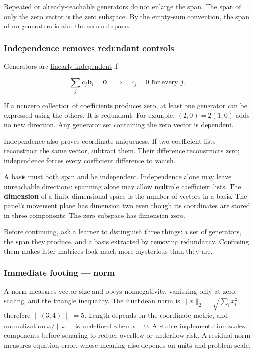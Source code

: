 Repeated or already-reachable generators do not enlarge the span. The span of only the zero vector is the zero subspace. By the empty-sum convention, the span of no generators is also the zero subspace.

\subsubsection{Independence removes redundant controls}\label{01-foundations-i-ch017-independence-removes-redundant-controls}

Generators are \hyperref[01-foundations-i-ch019-coordinates-can-change-while-the-geometric-object-stays-still]{linearly independent} if

\[
\sum_jc_j\mathbf b_j=\mathbf0
\quad\Longrightarrow\quad c_j=0\text{ for every }j.
\]

If a nonzero collection of coefficients produces zero, at least one generator can be expressed using the others. It is redundant. For example, \((2,0)=2(1,0)\) adds no new direction. Any generator set containing the zero vector is dependent.

Independence also proves coordinate uniqueness. If two coefficient lists reconstruct the same vector, subtract them. Their difference reconstructs zero; independence forces every coefficient difference to vanish.

A basis must both span and be independent. Independence alone may leave unreachable directions; spanning alone may allow multiple coefficient lists. The \textbf{dimension} of a finite-dimensional space is the number of vectors in a basis. The panel's movement plane has dimension two even though its coordinates are stored in three components. The zero subspace has dimension zero.

Before continuing, ask a learner to distinguish three things: a set of generators, the span they produce, and a basis extracted by removing redundancy. Confusing them makes later matrices look much more mysterious than they are.

\subsubsection{Immediate footing --- norm}\label{01-foundations-i-ch017-immediate-footing-norm}

A norm measures vector size and obeys nonnegativity, vanishing only at zero, scaling, and the triangle inequality. The Euclidean norm is \(\|x\|_2=\sqrt{\sum_i x_i^2}\); therefore \(\|(3,4)\|_2=5\). Length depends on the coordinate metric, and normalization \(x/\|x\|\) is undefined when \(x=0\). A stable implementation scales components before squaring to reduce overflow or underflow risk. A residual norm measures equation error, whose meaning also depends on units and problem scale.

